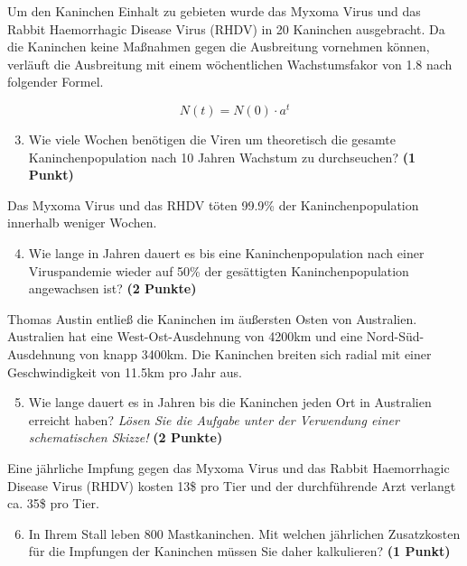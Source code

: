 \documentclass[a4paper, 9pt]{scrartcl}\usepackage[]{graphicx}\usepackage[]{xcolor}
\begin{document}
Um den Kaninchen Einhalt zu gebieten wurde das Myxoma Virus und das Rabbit
Haemorrhagic Disease Virus (RHDV) in 20 Kaninchen
ausgebracht. Da die Kaninchen keine Ma{\ss}nahmen gegen die Ausbreitung
vornehmen k{\"o}nnen, verl{\"a}uft die Ausbreitung mit einem w{\"o}chentlichen
Wachstumsfakor von 1.8 nach folgender Formel.

\begin{equation*}
  N(t) = N(0) \cdot a^t
\end{equation*}

\begin{enumerate}
  \setcounter{enumi}{2}
\item Wie viele Wochen ben{\"o}tigen die Viren um theoretisch die gesamte
  Kaninchenpopulation nach 10 Jahren Wachstum zu
  durchseuchen? \textbf{(1 Punkt)}
\end{enumerate}

Das Myxoma Virus und das RHDV t{\"o}ten 99.9\% der
Kaninchenpopulation innerhalb weniger Wochen.

\begin{enumerate}
  \setcounter{enumi}{3}  
\item Wie lange in Jahren dauert es bis eine Kaninchenpopulation nach einer
  Viruspandemie wieder auf 50\% der ges{\"a}ttigten
  Kaninchenpopulation angewachsen ist?  \textbf{(2 Punkte)}
\end{enumerate}

Thomas Austin entlie{\ss} die Kaninchen im {\"a}u{\ss}ersten Osten von
Australien. Australien hat eine West-Ost-Ausdehnung von 4200km
und eine Nord-S{\"u}d-Ausdehnung von knapp 3400km. Die Kaninchen
breiten sich radial mit einer Geschwindigkeit von 11.5km pro
Jahr aus.

\begin{enumerate}
  \setcounter{enumi}{4}
\item Wie lange dauert es in Jahren bis die Kaninchen jeden Ort
  in Australien erreicht haben? \textit{L{\"o}sen Sie die Aufgabe unter der
    Verwendung einer schematischen Skizze!} \textbf{(2 Punkte)}
\end{enumerate}

Eine j{\"a}hrliche Impfung gegen das Myxoma Virus und das Rabbit Haemorrhagic
Disease Virus (RHDV) kosten 13\$ pro Tier und der
durchf{\"u}hrende Arzt verlangt ca. 35\$ pro Tier.

\begin{enumerate}
  \setcounter{enumi}{5}
\item In Ihrem Stall leben 800 Mastkaninchen. Mit welchen
  j{\"a}hrlichen Zusatzkosten f{\"u}r die Impfungen der Kaninchen m{\"u}ssen Sie daher
  kalkulieren? \textbf{(1 Punkt)}
\end{enumerate}
 
\end{document}
